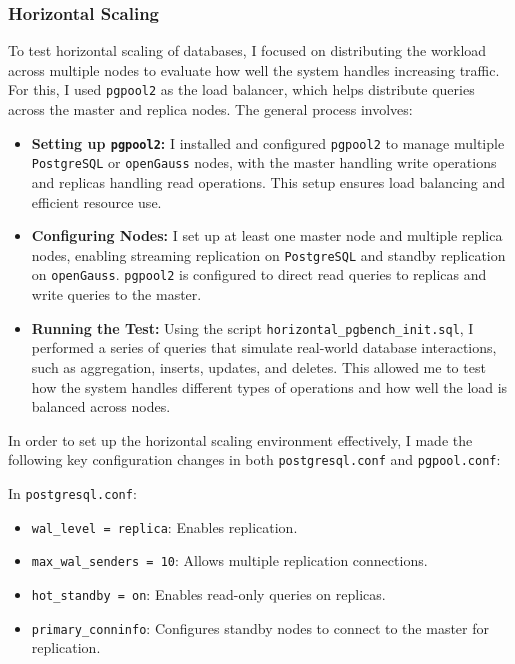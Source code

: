 \documentclass[12pt,a4paper,cs4size]{ctexart}
\begin{document}
\vspace{0.5cm}

\subsubsection*{Horizontal Scaling}

To test horizontal scaling of databases, I focused on distributing the workload across multiple nodes to evaluate how well the system handles increasing traffic. For this, I used \texttt{pgpool2} as the load balancer, which helps distribute queries across the master and replica nodes. The general process involves:
\begin{itemize}
    \item\textbf{Setting up \texttt{pgpool2}:} I installed and configured \texttt{pgpool2} to manage multiple \texttt{PostgreSQL} or \texttt{openGauss} nodes, with the master handling write operations and replicas handling read operations. This setup ensures load balancing and efficient resource use.
    \item\textbf{Configuring Nodes:} I set up at least one master node and multiple replica nodes, enabling streaming replication on \texttt{PostgreSQL} and standby replication on \texttt{openGauss}. \texttt{pgpool2} is configured to direct read queries to replicas and write queries to the master.
    \item\textbf{Running the Test:} Using the script \texttt{horizontal\_pgbench\_init.sql}\cite{github2024}, I performed a series of queries that simulate real-world database interactions, such as aggregation, inserts, updates, and deletes. This allowed me to test how the system handles different types of operations and how well the load is balanced across nodes.
\end{itemize}

In order to set up the horizontal scaling environment effectively, I made the following key configuration changes in both \texttt{postgresql.conf} and \texttt{pgpool.conf}:

In \texttt{postgresql.conf}:

\begin{itemize}
    \item \texttt{wal\_level = replica}: Enables replication.
    \item \texttt{max\_wal\_senders = 10}: Allows multiple replication connections.
    \item \texttt{hot\_standby = on}: Enables read-only queries on replicas.
    \item \texttt{primary\_conninfo}: Configures standby nodes to connect to the master for replication.
\end{itemize}
\end{document}
